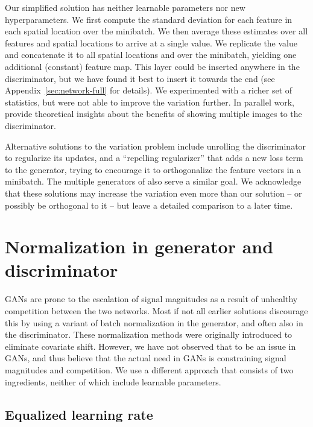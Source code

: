 \documentclass{article}
\newcommand{\FINAL}[2][]{#2} %
\begin{document}
Our simplified solution has neither learnable parameters nor new hyperparameters. We first compute the standard deviation for each feature in each spatial location over the minibatch. We then average these estimates over all features and spatial locations to arrive at a single value. We replicate the value and concatenate it to all spatial locations and over the minibatch, yielding one additional (constant) feature map. This layer could be inserted anywhere in the discriminator, but we have found it best to insert it towards the end (see Appendix~\ref{sec:network-full} for details).  We experimented with a richer set of statistics, but were not able to improve the variation further.
\FINAL{In parallel work, \cite{Zinan2017} provide theoretical insights about the benefits of showing multiple images to the discriminator.}

Alternative solutions to the variation problem include unrolling the discriminator \citep{Metz2016} to regularize its updates, and a ``repelling regularizer''
\citep{Zhao2016} that adds a new loss term to the generator, trying to encourage it to orthogonalize the feature vectors in a minibatch. The multiple generators of \cite{Ghosh2017} also serve a similar goal. We acknowledge that these solutions may increase the variation even more than our solution -- or possibly be orthogonal to it -- but leave a detailed comparison to a later time. %

\section{Normalization in generator and discriminator}
\label{sec:normalization}

GANs are prone to the escalation of signal magnitudes as a result of unhealthy competition between the two networks. Most if not all earlier solutions discourage this by using a variant of batch normalization \citep{Ioffe2015,Salimans2016A,Ba2016} in the generator, and often also in the discriminator. These normalization methods were originally introduced to eliminate covariate shift. However, we have not observed that to be an issue in GANs, and thus believe that the actual need in GANs is constraining signal magnitudes and competition. We use a different approach that consists of two ingredients, neither of which  include learnable parameters.

\subsection{Equalized learning rate}
\label{sec:effective_learning_rate}
\end{document}
